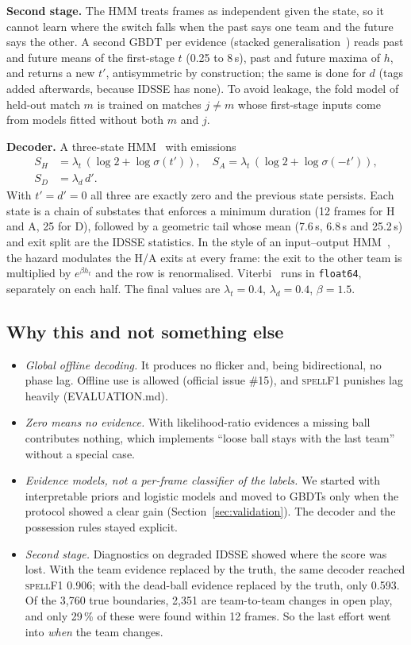 \documentclass[journal]{IEEEtran}
\newcommand{\spf}{\textsc{spellF1}}
\begin{document}
\textbf{Second stage.} The HMM treats frames as independent given the state, so it cannot learn where the switch falls when the past says one team and the future says the other. A second GBDT per evidence (stacked generalisation~\cite{wolpert1992}) reads past and future means of the first-stage $t$ (0.25 to 8\,s), past and future maxima of $h$, and returns a new $t'$, antisymmetric by construction; the same is done for $d$ (tags added afterwards, because IDSSE has none). To avoid leakage, the fold model of held-out match $m$ is trained on matches $j\neq m$ whose first-stage inputs come from models fitted without both $m$ and $j$.

\textbf{Decoder.} A three-state HMM~\cite{rabiner1989} with emissions
\begin{equation}
\begin{split}
S_H &= \lambda_t\,(\log 2+\log\sigma(t')),\quad S_A=\lambda_t\,(\log 2+\log\sigma(-t')),\\
S_D &= \lambda_d\, d'.
\end{split}
\end{equation}
With $t'=d'=0$ all three are exactly zero and the previous state persists. Each state is a chain of substates that enforces a minimum duration (12 frames for H and A, 25 for D), followed by a geometric tail whose mean (7.6\,s, 6.8\,s and 25.2\,s) and exit split are the IDSSE statistics. In the style of an input--output HMM~\cite{bengio1995}, the hazard modulates the H/A exits at every frame: the exit to the other team is multiplied by $e^{\beta h_t}$ and the row is renormalised. Viterbi~\cite{forney1973} runs in \texttt{float64}, separately on each half. The final values are $\lambda_t=0.4$, $\lambda_d=0.4$, $\beta=1.5$.

\subsection{Why this and not something else}
\begin{itemize}
\item \emph{Global offline decoding.} It produces no flicker and, being bidirectional, no phase lag. Offline use is allowed (official issue \#15), and \spf{} punishes lag heavily (EVALUATION.md).
\item \emph{Zero means no evidence.} With likelihood-ratio evidences a missing ball contributes nothing, which implements ``loose ball stays with the last team'' without a special case.
\item \emph{Evidence models, not a per-frame classifier of the labels.} We started with interpretable priors and logistic models and moved to GBDTs only when the protocol showed a clear gain (Section~\ref{sec:validation}). The decoder and the possession rules stayed explicit.
\item \emph{Second stage.} Diagnostics on degraded IDSSE showed where the score was lost. With the team evidence replaced by the truth, the same decoder reached \spf{} 0.906; with the dead-ball evidence replaced by the truth, only 0.593. Of the 3{,}760 true boundaries, 2{,}351 are team-to-team changes in open play, and only 29\,\% of these were found within 12 frames. So the last effort went into \emph{when} the team changes.
\end{itemize}
\end{document}
